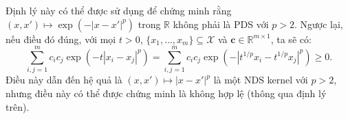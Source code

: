 Định lý này có thể được sử dụng để chứng minh rằng  $(x, x') \mapsto
\exp(-|x - x'|^p)$ trong $\mathbb{R}$ không phải là PDS với $p > 2$. Ngược lại,
nếu điều đó đúng, với mọi $t > 0$, $\{x_1, \dots, x_m\} \subseteq \mathcal{X}$
và $\mathbf{c} \in \mathbb{R}^{m \times 1}$, ta sẽ có: \begin{equation}
  \sum_{i,j=1}^{m} c_i c_j \exp(-t|x_i - x_j|^p) = \sum_{i,j=1}^{m} c_i c_j
  \exp(-|t^{1/p}x_i - t^{1/p}x_j|^p) \geq 0.
\end{equation} Điều này dẫn đến hệ quả là $(x, x') \mapsto |x - x'|^p$ là một
NDS kernel với $p > 2$, nhưng điều này có thể được chứng minh là không hợp lệ
(thông qua định lý trên).
